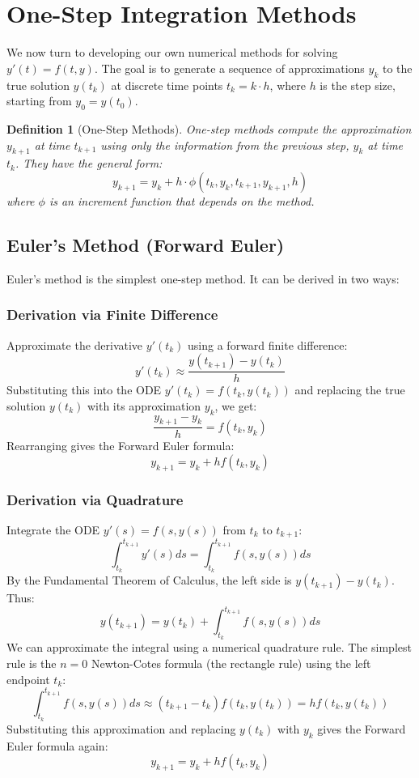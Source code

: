 \documentclass{article}
\newtheorem{definition}{Definition}
\begin{document}
\section{One-Step Integration Methods}

We now turn to developing our own numerical methods for solving $y'(t) = f(t, y)$. The goal is to generate a sequence of approximations $y_k$ to the true solution $y(t_k)$ at discrete time points $t_k = k \cdot h$, where $h$ is the step size, starting from $y_0 = y(t_0)$.

\begin{definition}[One-Step Methods]
One-step methods compute the approximation $y_{k+1}$ at time $t_{k+1}$ using only the information from the previous step, $y_k$ at time $t_k$. They have the general form:
\[
y_{k+1} = y_k + h \cdot \phi(t_k, y_k, t_{k+1}, y_{k+1}, h)
\]
where $\phi$ is an increment function that depends on the method.
\end{definition}

\subsection{Euler's Method (Forward Euler)}
Euler's method is the simplest one-step method. It can be derived in two ways:

\subsubsection{Derivation via Finite Difference}
Approximate the derivative $y'(t_k)$ using a forward finite difference:
\[
y'(t_k) \approx \frac{y(t_{k+1}) - y(t_k)}{h}
\]
Substituting this into the ODE $y'(t_k) = f(t_k, y(t_k))$ and replacing the true solution $y(t_k)$ with its approximation $y_k$, we get:
\[
\frac{y_{k+1} - y_k}{h} = f(t_k, y_k)
\]
Rearranging gives the Forward Euler formula:
\begin{equation} \label{eq:forward_euler}
y_{k+1} = y_k + h f(t_k, y_k)
\end{equation}

\subsubsection{Derivation via Quadrature}
Integrate the ODE $y'(s) = f(s, y(s))$ from $t_k$ to $t_{k+1}$:
\[
\int_{t_k}^{t_{k+1}} y'(s) ds = \int_{t_k}^{t_{k+1}} f(s, y(s)) ds
\]
By the Fundamental Theorem of Calculus, the left side is $y(t_{k+1}) - y(t_k)$. Thus:
\[
y(t_{k+1}) = y(t_k) + \int_{t_k}^{t_{k+1}} f(s, y(s)) ds
\]
We can approximate the integral using a numerical quadrature rule. The simplest rule is the $n=0$ Newton-Cotes formula (the rectangle rule) using the left endpoint $t_k$:
\[
\int_{t_k}^{t_{k+1}} f(s, y(s)) ds \approx (t_{k+1} - t_k) f(t_k, y(t_k)) = h f(t_k, y(t_k))
\]
Substituting this approximation and replacing $y(t_k)$ with $y_k$ gives the Forward Euler formula again:
\[
y_{k+1} = y_k + h f(t_k, y_k)
\]
\end{document}
